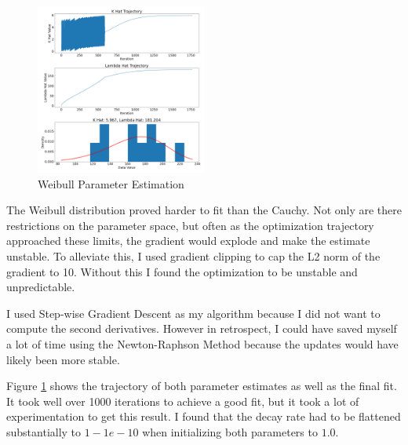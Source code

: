 

\begin{figure}[ht]
    \centering
    \includegraphics[width=0.5\textwidth]{figs/weibull_estimation.png}
    \caption{Weibull Parameter Estimation}
    \label{fig:Weibull_fit}
\end{figure}

The Weibull distribution proved harder to fit than the Cauchy.
Not only are there restrictions on the parameter space, but often as the optimization trajectory approached these limits, the gradient would explode and make the estimate unstable.
To alleviate this, I used gradient clipping to cap the L2 norm of the gradient to 10.
Without this I found the optimization to be unstable and unpredictable. 

I used Step-wise Gradient Descent as my algorithm because I did not want to compute the second derivatives.
However in retrospect, I could have saved myself a lot of time using the Newton-Raphson Method because the updates would have likely been more stable.

Figure \ref{fig:Weibull_fit} shows the trajectory of both parameter estimates as well as the final fit.
It took well over 1000 iterations to achieve a good fit, but it took a lot of experimentation to get this result.
I found that the decay rate had to be flattened substantially to $1-1e-10$ when initializing both parameters to $1.0$.
